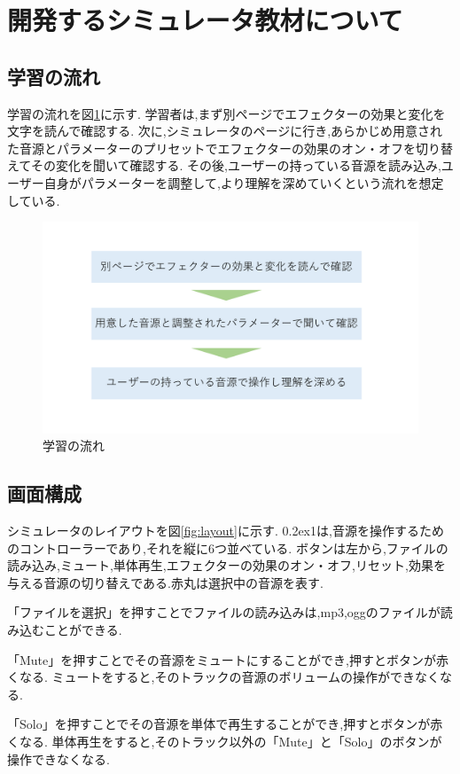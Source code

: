 \documentclass[12pt,a4j,titlepage]{ltjsarticle}
\begin{document}
\newpage
\section{開発するシミュレータ教材について}
\subsection{学習の流れ}
学習の流れを図\ref{fig:flow}に示す.
学習者は,まず別ページでエフェクターの効果と変化を文字を読んで確認する.
次に,シミュレータのページに行き,あらかじめ用意された音源とパラメーターのプリセットでエフェクターの効果のオン・オフを切り替えてその変化を聞いて確認する.
その後,ユーザーの持っている音源を読み込み,ユーザー自身がパラメーターを調整して,より理解を深めていくという流れを想定している.

\begin{figure}[H]
\centering
 \includegraphics[width=120mm]{./figures/flow.pdf}
 \caption{学習の流れ}
 \label{fig:flow}
\end{figure}

\subsection{画面構成}
シミュレータのレイアウトを図\ref{fig:layout}に示す.
\raise0.2ex\hbox{\textcircled{\scriptsize{1}}}は,音源を操作するためのコントローラーであり,それを縦に6つ並べている.
ボタンは左から,ファイルの読み込み,ミュート,単体再生,エフェクターの効果のオン・オフ,リセット,効果を与える音源の切り替えである.赤丸は選択中の音源を表す.

「ファイルを選択」を押すことでファイルの読み込みは,mp3,oggのファイルが読み込むことができる.

「Mute」を押すことでその音源をミュートにすることができ,押すとボタンが赤くなる.
ミュートをすると,そのトラックの音源のボリュームの操作ができなくなる.

「Solo」を押すことでその音源を単体で再生することができ,押すとボタンが赤くなる.
単体再生をすると,そのトラック以外の「Mute」と「Solo」のボタンが操作できなくなる.
\end{document}
